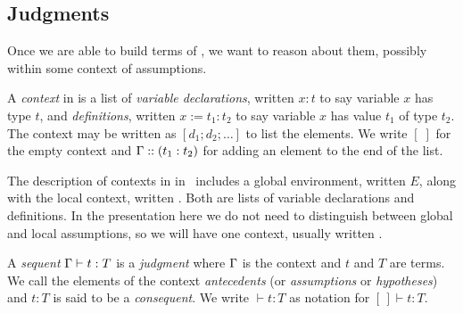 

\subsection{Judgments}

Once we are able to build terms of \coc{}, we want to reason about them, possibly within some context of assumptions.

\begin{defnc}[Context]
A \emph{context} in \coc{} is a list of \emph{variable declarations}, written $x : t$ to say variable $x$ has type $t$, and \emph{definitions}, written $x := t_1 : t_2$ to say variable $x$ has value $t_1$ of type $t_2$. The context may be written as $[d_1 ; d_2 ; \ldots]$ to list the elements. We write $[ \; ]$ for the empty context and $\Gamma{} :: (t_1 : t_2)$ for adding an element to the end of the list.
\end{defnc}

The description of contexts in \coc{} in~\cite{coq} includes a global environment, written $E$, along with the local context, written \dyncon{}. Both are lists of variable declarations and definitions. In the presentation here we do not need to distinguish between global and local assumptions, so we will have one context, usually written \dyncon{}.

\begin{defnc}
A \emph{sequent} $\Gamma{} \vdash t : T$ is a \emph{judgment} where $\Gamma{}$ is the context and $t$ and $T$ are \coc{} terms. We call the elements of the context \emph{antecedents} (or \emph{assumptions} or \emph{hypotheses}) and $t : T$ is said to be a \emph{consequent}. We write $\vdash t : T$ as notation for $[ \, ] \vdash t : T$.
\end{defnc}

